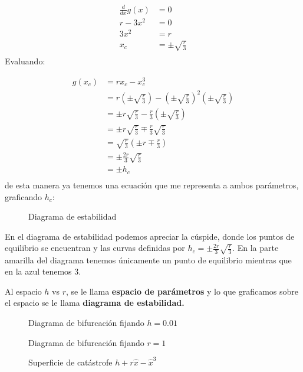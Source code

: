$$
\begin{aligned}
  \frac{d}{dx}g(x) &= 0 \\ 
  r-3x^2 &= 0 \\ 
  3x^2 &= r  \\
  x_c &= \pm \sqrt{\frac{r}{3}} \\ 
\end{aligned}
$$
Evaluando:

$$
\begin{aligned}
  g(x_c)&=rx_c - x_c^3  \\
	&= r \left( \pm \sqrt{\frac{r}{3}} \right) - \left( \pm \sqrt{\frac{r}{3}} \right)^2 \left( \pm \sqrt{\frac{r}{3}} \right) \\
  &= \pm r \sqrt{\frac{r}{3}} - \frac{r}{3} \left( \pm \sqrt{\frac{r}{3}} \right)  \\ 
  &= \pm r \sqrt{\frac{r}{3}} \mp \frac{r}{3} \sqrt{\frac{r}{3}} \\
  &= \sqrt{\frac{r}{3}} \left( \pm r \mp \frac{r}{3} \right)  \\
  &= \pm \frac{2r}{3} \sqrt{\frac{r}{3}} \\
  &= \pm h_c \\ 
\end{aligned}
$$
de esta manera ya tenemos una ecuación que me representa a ambos parámetros, graficando $h_c$:

\begin{figure}[ht]
    \centering
    \caption{Diagrama de estabilidad}
    \label{fig:pc1}
\end{figure}

En el diagrama de estabilidad podemos apreciar la cúspide, donde los puntos de equilibrio se encuentran y las curvas definidas por $h_c = \pm \frac{2r}{3} \sqrt{\frac{r}{3}}$. En la parte amarilla del diagrama tenemos únicamente un punto de equilibrio mientras que en la azul tenemos 3.  

\begin{tcolorbox}[colback=Black!4,colframe=White] 
  \begin{nota}
  Al espacio $h$ vs $r$, se le llama \textbf{espacio de parámetros} y lo que graficamos sobre el espacio se le llama \textbf{diagrama de estabilidad. } 
\end{nota}
\end{tcolorbox}

\begin{figure}[ht]
    \centering
    \caption{Diagrama de bifurcación fijando $h=0.01$}
    \label{fig:4bif1}
\end{figure}

\begin{figure}[ht]
    \centering
    \caption{Diagrama de bifurcación fijando $r=1$}
\end{figure}    

\begin{figure}[H]
    \centering
    \caption{Superficie de catástrofe $h+r\hat{x}-\hat{x}^3$}
    \label{fig:supcat}
\end{figure}   
 

